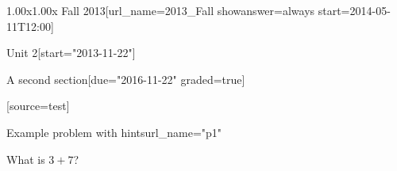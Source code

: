 \documentclass[12pt]{article}
\begin{document}
\begin{edXcourse}{1.00x}{1.00x Fall 2013}[url_name=2013_Fall showanswer=always start=2014-05-11T12:00]
\begin{edXchapter}{Unit 2}[start="2013-11-22"]
\begin{edXsection}{A second section}[due="2016-11-22" graded=true]

[source=test]

\begin{edXproblem}{Example problem with hints}{url_name="p1"}
 
What is $3+7$?


\end{edXproblem}



\end{edXsection}
\end{edXchapter}
\end{edXcourse}

\end{document}
